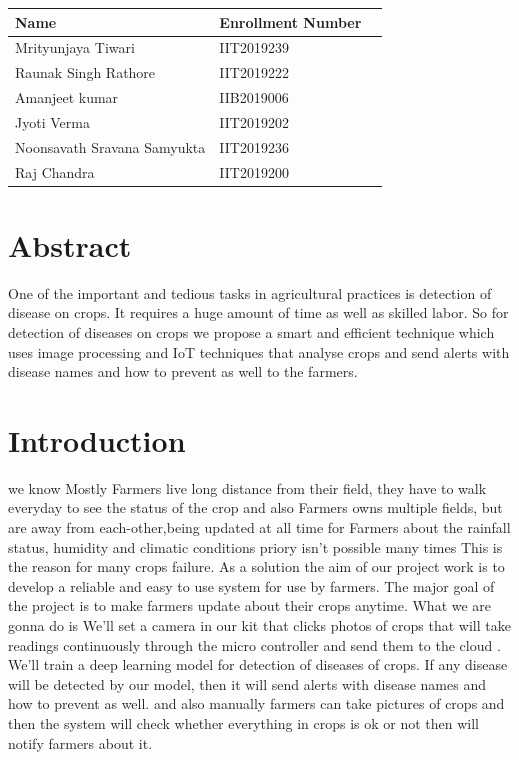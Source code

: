 \documentclass{article}
\begin{document}
\begin{center}
     
     \begin{tabular}{ |p{7cm}|p{7cm}|p{7cm}|  }
\hline
Name& Enrollment Number \\
\hline
Mrityunjaya Tiwari & IIT2019239\\
                    Raunak Singh Rathore  & IIT2019222\\
                     Amanjeet kumar  & IIB2019006\\
                      Jyoti Verma  & IIT2019202\\
                        Noonsavath Sravana Samyukta & IIT2019236\\
                          Raj Chandra & IIT2019200\\
\hline
\end{tabular}
         
         

    
\end{center}
\newpage
\setcounter{page}{1}
\tableofcontents
\newpage



\section{Abstract}
\large{One of the important and tedious tasks in agricultural practices is detection of disease on crops. It requires a huge amount of time as well as skilled labor. So for detection of diseases on crops we propose a smart and efficient technique which uses image processing and IoT techniques that analyse crops and send alerts with disease names and how to prevent as well to the farmers.}
\section{Introduction}
\large{we know Mostly Farmers live long distance from their field, they have to walk everyday to see the status of the crop and also Farmers owns multiple fields, but are away from each-other,being updated at all time for Farmers about the rainfall status, humidity and climatic conditions priory isn't possible many times This is the reason for many crops failure. As a solution the aim of our project work is to develop a reliable and easy to use system for use by farmers. The major goal of the project is to make farmers update about their crops anytime. What we are gonna do is We'll set a camera in our kit that clicks photos of crops that will take readings continuously through the micro controller and send them to the cloud . We'll train a deep learning model for detection of diseases of crops. If any disease will be detected by our model, then it will send alerts with disease names and how to prevent as well. and also manually farmers can take pictures of crops and then the system will check whether everything in crops is ok or not then will notify farmers about it. }
\end{document}
